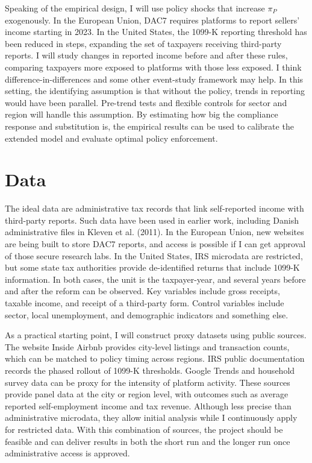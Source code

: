 \documentclass[11pt]{article}
\begin{document}
Speaking of the empirical design, I will use policy shocks that increase $\pi_P$ exogenously. In the European Union, DAC7 requires platforms to report sellers’ income starting in 2023. In the United States, the 1099-K reporting threshold has been reduced in steps, expanding the set of taxpayers receiving third-party reports. I will study changes in reported income before and after these rules, comparing taxpayers more exposed to platforms with those less exposed. I think difference-in-differences and some other event-study framework may help. In this setting, the identifying assumption is that without the policy, trends in reporting would have been parallel. Pre-trend tests and flexible controls for sector and region will handle this assumption. By estimating how big the compliance response and substitution is, the empirical results can be used to calibrate the extended model and evaluate optimal policy enforcement.

\section*{Data}
The ideal data are administrative tax records that link self-reported income with third-party reports. Such data have been used in earlier work, including Danish administrative files in Kleven et al. (2011). In the European Union, new websites are being built to store DAC7 reports, and access is possible if I can get approval of those secure research labs. In the United States, IRS microdata are restricted, but some state tax authorities provide de-identified returns that include 1099-K information. In both cases, the unit is the taxpayer-year, and several years before and after the reform can be observed. Key variables include gross receipts, taxable income, and receipt of a third-party form. Control variables include sector, local unemployment, and demographic indicators and something else.

As a practical starting point, I will construct proxy datasets using public sources. The website Inside Airbnb provides city-level listings and transaction counts, which can be matched to policy timing across regions. IRS public documentation records the phased rollout of 1099-K thresholds. Google Trends and household survey data can be proxy for the intensity of platform activity. These sources provide panel data at the city or region level, with outcomes such as average reported self-employment income and tax revenue. Although less precise than administrative microdata, they allow initial analysis while I continuously apply for restricted data. With this combination of sources, the project should be feasible and can deliver results in both the short run and the longer run once administrative access is approved.
\end{document}
